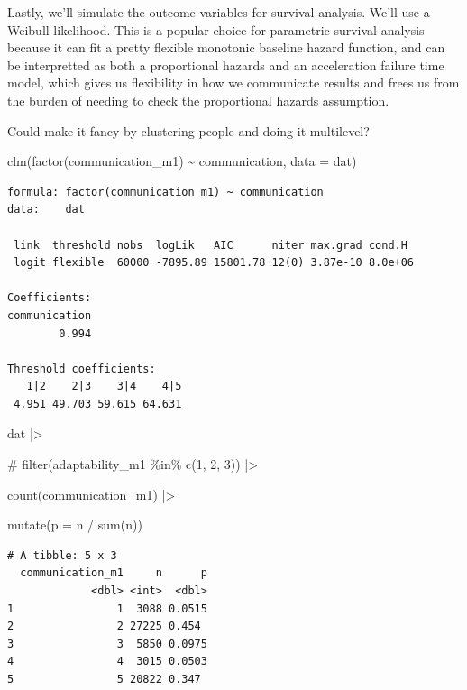 \documentclass[
  letterpaper,
  DIV=11,
  numbers=noendperiod]{scrreprt}
\newenvironment{Shaded}{\begin{snugshade}}{\end{snugshade}}
\newcommand{\AttributeTok}[1]{\textcolor[rgb]{0.40,0.45,0.13}{#1}}
\newcommand{\CommentTok}[1]{\textcolor[rgb]{0.37,0.37,0.37}{#1}}
\newcommand{\FunctionTok}[1]{\textcolor[rgb]{0.28,0.35,0.67}{#1}}
\newcommand{\NormalTok}[1]{\textcolor[rgb]{0.00,0.23,0.31}{#1}}
\newcommand{\SpecialCharTok}[1]{\textcolor[rgb]{0.37,0.37,0.37}{#1}}
\begin{document}
Lastly, we'll simulate the outcome variables for survival analysis.
We'll use a Weibull likelihood. This is a popular choice for parametric
survival analysis because it can fit a pretty flexible monotonic
baseline hazard function, and can be interpretted as both a proportional
hazards and an acceleration failure time model, which gives us
flexibility in how we communicate results and frees us from the burden
of needing to check the proportional hazards assumption.

Could make it fancy by clustering people and doing it multilevel?

\begin{Shaded}
\begin{Highlighting}[]
\FunctionTok{clm}\NormalTok{(}\FunctionTok{factor}\NormalTok{(communication\_m1) }\SpecialCharTok{\textasciitilde{}}\NormalTok{ communication, }\AttributeTok{data =}\NormalTok{ dat)}
\end{Highlighting}
\end{Shaded}

\begin{verbatim}
formula: factor(communication_m1) ~ communication
data:    dat

 link  threshold nobs  logLik   AIC      niter max.grad cond.H 
 logit flexible  60000 -7895.89 15801.78 12(0) 3.87e-10 8.0e+06

Coefficients:
communication 
        0.994 

Threshold coefficients:
   1|2    2|3    3|4    4|5 
 4.951 49.703 59.615 64.631 
\end{verbatim}

\begin{Shaded}
\begin{Highlighting}[]
\NormalTok{dat }\SpecialCharTok{|\textgreater{}} 

 \CommentTok{\#   filter(adaptability\_m1 \%in\% c(1, 2, 3)) |\textgreater{}}

    \FunctionTok{count}\NormalTok{(communication\_m1) }\SpecialCharTok{|\textgreater{}}

    \FunctionTok{mutate}\NormalTok{(}\AttributeTok{p =}\NormalTok{ n }\SpecialCharTok{/} \FunctionTok{sum}\NormalTok{(n))}
\end{Highlighting}
\end{Shaded}

\begin{verbatim}
# A tibble: 5 x 3
  communication_m1     n      p
             <dbl> <int>  <dbl>
1                1  3088 0.0515
2                2 27225 0.454 
3                3  5850 0.0975
4                4  3015 0.0503
5                5 20822 0.347 
\end{verbatim}
\end{document}
